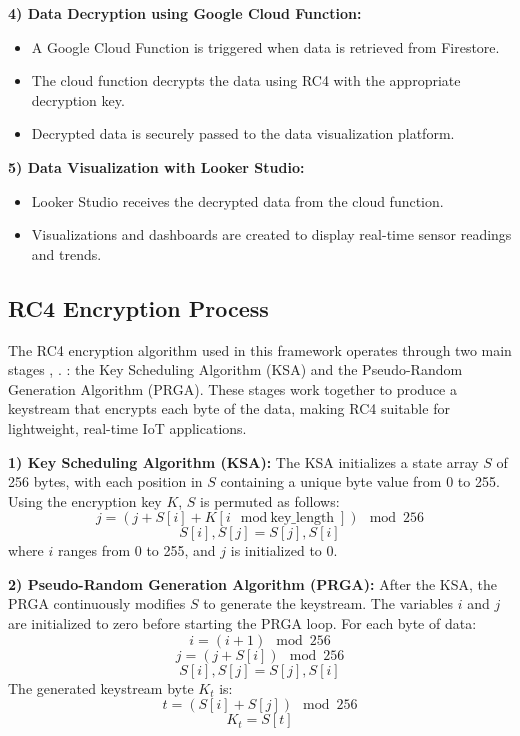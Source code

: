 \documentclass[conference]{IEEEtran}
\begin{document}
\textbf{4) Data Decryption using Google Cloud Function:}
\begin{itemize}
    \item A Google Cloud Function is triggered when data is retrieved from Firestore.
    \item The cloud function decrypts the data using RC4 with the appropriate decryption key.
    \item Decrypted data is securely passed to the data visualization platform.
\end{itemize}

\textbf{5) Data Visualization with Looker Studio:}
\begin{itemize}
    \item Looker Studio receives the decrypted data from the cloud function.
    \item Visualizations and dashboards are created to display real-time sensor readings and trends.
\end{itemize}

\subsection{RC4 Encryption Process}
The RC4 encryption algorithm used in this framework operates through two main stages \cite{ref2}, \cite{ref9} . : the Key Scheduling Algorithm (KSA) and the Pseudo-Random Generation Algorithm (PRGA). These stages work together to produce a keystream that encrypts each byte of the data, making RC4 suitable for lightweight, real-time IoT applications.

\textbf{1) Key Scheduling Algorithm (KSA):} The KSA initializes a state array \( S \) of 256 bytes, with each position in \( S \) containing a unique byte value from 0 to 255. Using the encryption key \( K \), \( S \) is permuted as follows:
\begin{equation}
    j = (j + S[i] + K[i \mod \text{key\_length}]) \mod 256
\end{equation}
\begin{equation}
    S[i], S[j] = S[j], S[i]
\end{equation}
where \( i \) ranges from 0 to 255, and \( j \) is initialized to 0.

\textbf{2) Pseudo-Random Generation Algorithm (PRGA):} After the KSA, the PRGA continuously modifies \( S \) to generate the keystream. The variables \( i \) and \( j \) are initialized to zero before starting the PRGA loop. For each byte of data:
\begin{equation}
    i = (i + 1) \mod 256
\end{equation}
\begin{equation}
    j = (j + S[i]) \mod 256
\end{equation}
\begin{equation}
    S[i], S[j] = S[j], S[i]
\end{equation}
The generated keystream byte \( K_t \) is:
\begin{equation}
    t = (S[i] + S[j]) \mod 256
\end{equation}
\begin{equation}
    K_t = S[t]
\end{equation}
\end{document}

